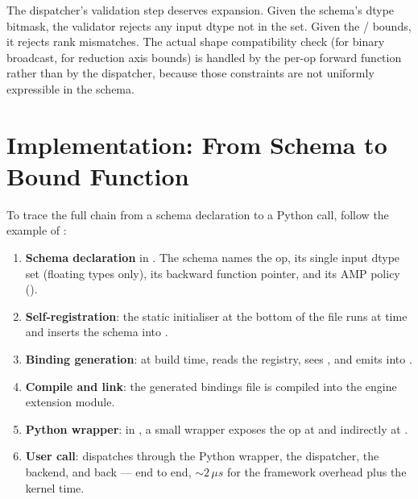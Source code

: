 The dispatcher's validation step deserves expansion. Given the
schema's  dtype bitmask, the validator
rejects any input dtype not in the set. Given the
/ bounds, it rejects rank
mismatches. The actual shape compatibility check
(for binary broadcast, for reduction axis bounds) is handled by
the per-op forward function rather than by the dispatcher, because
those constraints are not uniformly expressible in the schema.

\section{Implementation: From Schema to Bound Function}
\label{sec:op_registry:impl_path}

To trace the full chain from a schema declaration to a Python
call, follow the example of :

\begin{enumerate}
  \item \textbf{Schema declaration} in
    . The schema names
    the op, its single input dtype set (floating types only), its
    backward function pointer, and its AMP policy
    ().
  \item \textbf{Self-registration}: the static initialiser at the
    bottom of the file runs at  time and inserts the
    schema into .
  \item \textbf{Binding generation}: at build time,
     reads the registry, sees
    , and emits  into .
  \item \textbf{Compile and link}: the generated bindings file is
    compiled into the engine extension module.
  \item \textbf{Python wrapper}: in
    , a small wrapper
    exposes the op at  and
    indirectly at .
  \item \textbf{User call}:  dispatches through
    the Python wrapper, the dispatcher, the backend, and back ---
    end to end, ${\sim} 2\,\mu s$ for the framework overhead plus
    the kernel time.
\end{enumerate}

